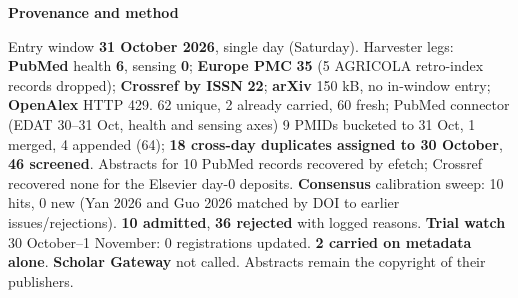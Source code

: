 \documentclass[10pt]{article}
\begin{document}
\begin{keybox}
{\sffamily\bfseries\footnotesize\color{Deep}Provenance and method}\\[1.2mm]
{\fontsize{7.2}{8.8}\selectfont
Entry window \textbf{31 October 2026}, single day (Saturday). Harvester legs: \textbf{PubMed} health
\textbf{6}, sensing \textbf{0}; \textbf{Europe PMC} \textbf{35} (5 AGRICOLA retro-index records dropped);
\textbf{Crossref by ISSN} \textbf{22}; \textbf{arXiv} 150 kB, no in-window entry; \textbf{OpenAlex} HTTP 429. 62 unique,
2 already carried, 60 fresh; PubMed connector (EDAT 30--31 Oct, health and sensing axes) 9 PMIDs bucketed to 31 Oct,
1 merged, 4 appended (64); \textbf{18 cross-day duplicates assigned to 30 October}, \textbf{46 screened}. Abstracts for
10 PubMed records recovered by efetch; Crossref recovered none for the Elsevier day-0 deposits. \textbf{Consensus}
calibration sweep: 10 hits, 0 new (Yan 2026 and Guo 2026 matched by DOI to earlier issues/rejections).
\textbf{10 admitted}, \textbf{36 rejected} with logged reasons. \textbf{Trial watch} 30 October--1 November: 0
registrations updated. \textbf{2 carried on metadata alone}. \textbf{Scholar Gateway} not called.
Abstracts remain the copyright of their publishers.\par}
\end{keybox}
\end{document}
